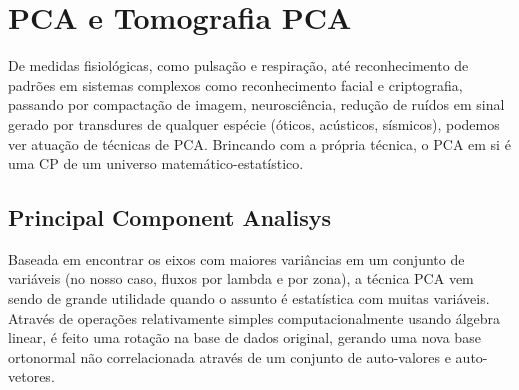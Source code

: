 


\chapter{PCA e Tomografia PCA}
\label{sec:PCAeTomoPCA}

De medidas fisiológicas, como pulsação e respiração, até reconhecimento de
padrões em sistemas complexos como reconhecimento facial e criptografia,
passando por compactação de imagem, neurosciência, redução de ruídos em sinal
gerado por transdures de qualquer espécie (óticos, acústicos, sísmicos), podemos ver
atuação de técnicas de PCA. \ojo Brincando com a própria técnica, o PCA em si é
uma CP de um universo matemático-estatístico.


\section{Principal Component Analisys}
\label{sec:PCAeTomoPCA:PCA}

Baseada em encontrar os eixos com maiores variâncias em um conjunto de variáveis
(no nosso caso, fluxos por lambda e por zona), a técnica PCA vem sendo de grande
utilidade quando o assunto é estatística com muitas variáveis. Através de
operações relativamente simples computacionalmente usando álgebra linear, é
feito uma rotação na base de dados original, gerando uma nova base ortonormal
não correlacionada através de um conjunto de auto-valores e auto-vetores.

